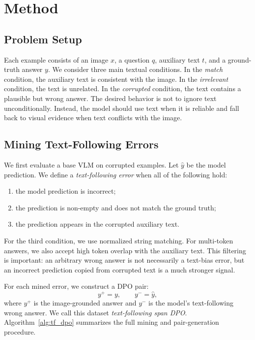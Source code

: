 \section{Method}

\subsection{Problem Setup}

Each example consists of an image $x$, a question $q$, auxiliary text $t$, and a ground-truth answer $y$.
We consider three main textual conditions.
In the \emph{match} condition, the auxiliary text is consistent with the image.
In the \emph{irrelevant} condition, the text is unrelated.
In the \emph{corrupted} condition, the text contains a plausible but wrong answer.
The desired behavior is not to ignore text unconditionally.
Instead, the model should use text when it is reliable and fall back to visual evidence when text conflicts with the image.

\subsection{Mining Text-Following Errors}

We first evaluate a base VLM on corrupted examples.
Let $\hat{y}$ be the model prediction.
We define a \emph{text-following error} when all of the following hold:
\begin{enumerate}[leftmargin=*]
    \item the model prediction is incorrect;
    \item the prediction is non-empty and does not match the ground truth;
    \item the prediction appears in the corrupted auxiliary text.
\end{enumerate}
For the third condition, we use normalized string matching.
For multi-token answers, we also accept high token overlap with the auxiliary text.
This filtering is important: an arbitrary wrong answer is not necessarily a text-bias error, but an incorrect prediction copied from corrupted text is a much stronger signal.

For each mined error, we construct a DPO pair:
\begin{equation}
    y^+ = y, \qquad y^- = \hat{y},
\end{equation}
where $y^+$ is the image-grounded answer and $y^-$ is the model's text-following wrong answer.
We call this dataset \emph{text-following span DPO}.
Algorithm~\ref{alg:tf_dpo} summarizes the full mining and pair-generation procedure.

